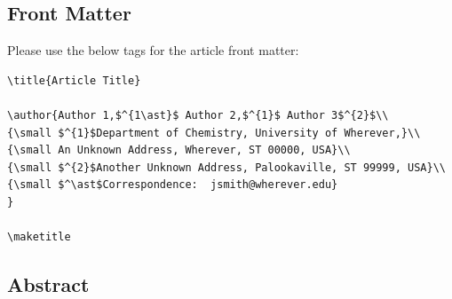 \documentclass[]{imag-ms-template}
\begin{document}



\newpage

\subsection{Front Matter}

Please use the below tags for the article front matter:

\begin{verbatim}
\title{Article Title} 

\author{Author 1,$^{1\ast}$ Author 2,$^{1}$ Author 3$^{2}$\\
{\small $^{1}$Department of Chemistry, University of Wherever,}\\
{\small An Unknown Address, Wherever, ST 00000, USA}\\
{\small $^{2}$Another Unknown Address, Palookaville, ST 99999, USA}\\
{\small $^\ast$Correspondence:  jsmith@wherever.edu}
}

\maketitle
\end{verbatim}

\subsection{Abstract}
\end{document}
